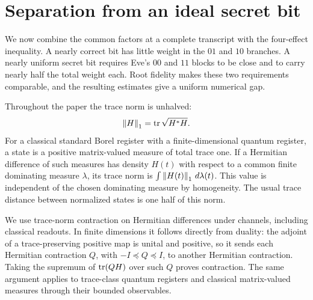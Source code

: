 \section{Separation from an ideal secret bit}
\label{sec:secret-key}

We now combine the common factors at a complete transcript with the
four-effect inequality.  A nearly correct bit has little weight in the
$01$ and $10$ branches.  A nearly uniform secret bit requires Eve's
$00$ and $11$ blocks to be close and to carry nearly half the total
weight each.  Root fidelity makes these two requirements comparable,
and the resulting estimates give a uniform numerical gap.

Throughout the paper the trace norm is unhalved:
\[
 \left\lVert H\right\rVert_1=\operatorname{tr}\sqrt{H^*H}.
\]
For a classical standard Borel register with a finite-dimensional
quantum register, a state is a positive matrix-valued measure of total
trace one.  If a Hermitian difference of such measures has density
$H(t)$ with respect to a common finite dominating measure $\lambda$,
its trace norm is $\int\left\lVert H(t)\right\rVert_1\,d\lambda(t)$.
This value is independent of the chosen dominating measure by
homogeneity.  The usual trace distance between normalized states is
one half of this norm.

We use trace-norm contraction on Hermitian differences under channels,
including classical readouts.  In finite dimensions it follows directly
from duality: the adjoint of a trace-preserving positive map is unital
and positive, so it sends each Hermitian contraction $Q$, with
$-I\preceq Q\preceq I$, to another Hermitian contraction.  Taking the
supremum of $\operatorname{tr}(QH)$ over such $Q$ proves contraction.  The same
argument applies to trace-class quantum registers and classical
matrix-valued measures through their bounded observables.

